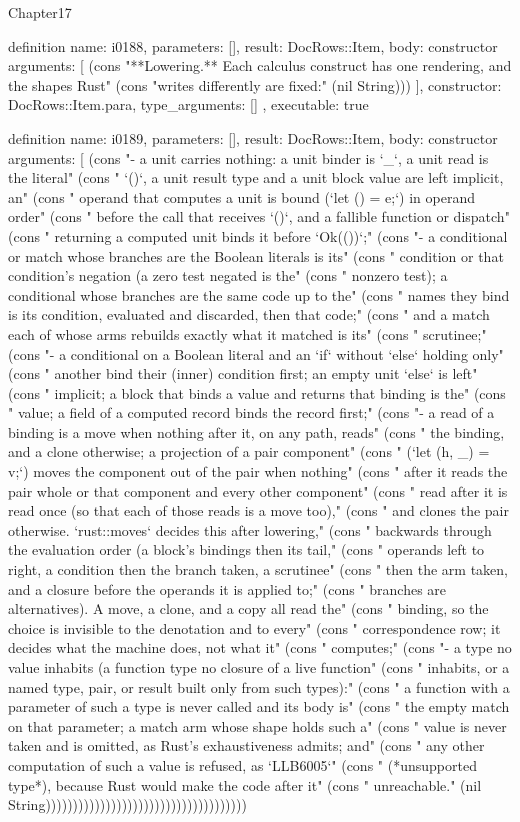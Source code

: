 \begin{lexlean}{Chapter17}
\begin{semanticmodule}
definition{
  name: i0188,
  parameters: [],
  result: DocRows::Item,
  body: constructor{
    arguments: [
      (cons "**Lowering.** Each calculus construct has one rendering, and the shapes Rust" (cons "writes differently are fixed:" (nil String)))
    ],
    constructor: DocRows::Item.para,
    type_arguments: []
  },
  executable: true
}

definition{
  name: i0189,
  parameters: [],
  result: DocRows::Item,
  body: constructor{
    arguments: [
      (cons "- a unit carries nothing: a unit binder is `_`, a unit read is the literal" (cons "  `()`, a unit result type and a unit block value are left implicit, an" (cons "  operand that computes a unit is bound (`let () = e;`) in operand order" (cons "  before the call that receives `()`, and a fallible function or dispatch" (cons "  returning a computed unit binds it before `Ok(())`;" (cons "- a conditional or match whose branches are the Boolean literals is its" (cons "  condition or that condition's negation (a zero test negated is the" (cons "  nonzero test); a conditional whose branches are the same code up to the" (cons "  names they bind is its condition, evaluated and discarded, then that code;" (cons "  and a match each of whose arms rebuilds exactly what it matched is its" (cons "  scrutinee;" (cons "- a conditional on a Boolean literal and an `if` without `else` holding only" (cons "  another bind their (inner) condition first; an empty unit `else` is left" (cons "  implicit; a block that binds a value and returns that binding is the" (cons "  value; a field of a computed record binds the record first;" (cons "- a read of a binding is a move when nothing after it, on any path, reads" (cons "  the binding, and a clone otherwise; a projection of a pair component" (cons "  (`let (h, _) = v;`) moves the component out of the pair when nothing" (cons "  after it reads the pair whole or that component and every other component" (cons "  read after it is read once (so that each of those reads is a move too)," (cons "  and clones the pair otherwise. `rust::moves` decides this after lowering," (cons "  backwards through the evaluation order (a block's bindings then its tail," (cons "  operands left to right, a condition then the branch taken, a scrutinee" (cons "  then the arm taken, and a closure before the operands it is applied to;" (cons "  branches are alternatives). A move, a clone, and a copy all read the" (cons "  binding, so the choice is invisible to the denotation and to every" (cons "  correspondence row; it decides what the machine does, not what it" (cons "  computes;" (cons "- a type no value inhabits (a function type no closure of a live function" (cons "  inhabits, or a named type, pair, or result built only from such types):" (cons "  a function with a parameter of such a type is never called and its body is" (cons "  the empty match on that parameter; a match arm whose shape holds such a" (cons "  value is never taken and is omitted, as Rust's exhaustiveness admits; and" (cons "  any other computation of such a value is refused, as `LLB6005`" (cons "  (*unsupported type*), because Rust would make the code after it" (cons "  unreachable." (nil String)))))))))))))))))))))))))))))))))))))
}}
\end{semanticmodule}
\end{lexlean}
